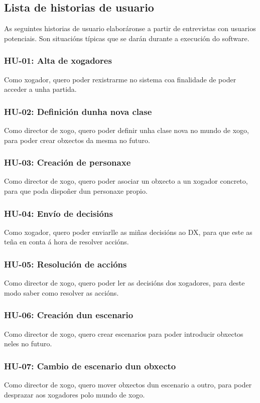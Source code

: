 \subsection{Lista de historias de usuario}
As seguintes historias de usuario elaboráronse a partir de entrevistas con
usuarios potenciais. Son situacións típicas que se darán durante a
execución do software.

\subsubsection{HU-01: Alta de xogadores}
Como xogador, quero poder rexistrarme no sistema coa finalidade de poder acceder
a unha partida.

\subsubsection{HU-02: Definición dunha nova clase}
Como director de xogo, quero poder definir unha clase nova no mundo de xogo,
para poder crear obxectos da mesma no futuro.

\subsubsection{HU-03: Creación de personaxe}
Como director de xogo, quero poder asociar un obxecto a un xogador concreto,
para que poda dispoñer dun personaxe propio.

\subsubsection{HU-04: Envío de decisións}
Como xogador, quero poder enviarlle as miñas decisións ao DX, para que este as
teña en conta á hora de resolver accións.
\subsubsection{HU-05: Resolución de accións}
Como director de xogo, quero poder ler as decisións dos xogadores, para deste
modo saber como resolver as accións.

\subsubsection{HU-06: Creación dun escenario}
Como director de xogo, quero crear escenarios para poder introducir obxectos
neles no futuro.

\subsubsection{HU-07: Cambio de escenario dun obxecto}
Como director de xogo, quero mover obxectos dun escenario a outro, para poder
desprazar aos xogadores polo mundo de xogo.



